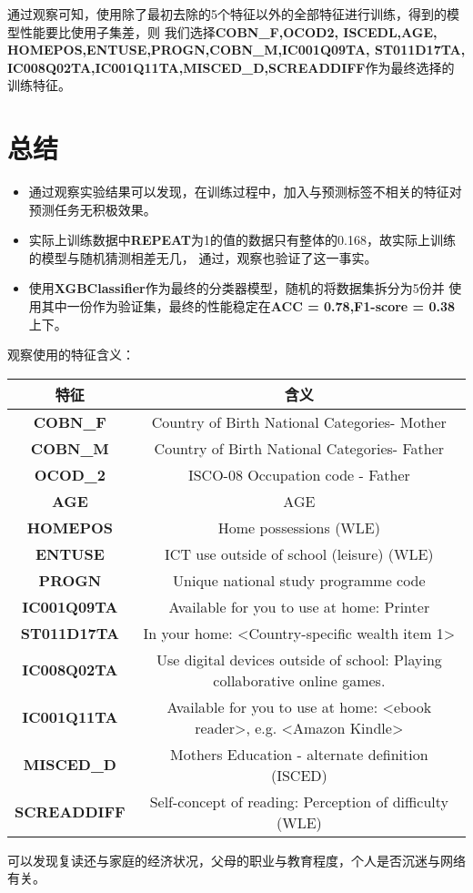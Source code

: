 \documentclass[12pt, a4paper, oneside]{ctexart}
\begin{document}
通过观察可知，使用除了最初去除的5个特征以外的全部特征进行训练，得到的模型性能要比使用子集差，则
我们选择\textbf{COBN\_F,OCOD2, ISCEDL,AGE,\\HOMEPOS,ENTUSE,PROGN,COBN\_M,IC001Q09TA,
ST011D17TA,\\IC008Q02TA,IC001Q11TA,MISCED\_D,SCREADDIFF}作为最终选择的训练特征。

\section{总结}
\begin{itemize}
    \item 通过观察实验结果可以发现，在训练过程中，加入与预测标签不相关的特征对预测任务无积极效果。
    \item 实际上训练数据中\textbf{REPEAT}为1的值的数据只有整体的0.168，故实际上训练的模型与随机猜测相差无几，
    通过，观察也验证了这一事实。
    \item 使用\textbf{XGBClassifier}作为最终的分类器模型，随机的将数据集拆分为5份并
    使用其中一份作为验证集，最终的性能稳定在\textbf{ACC = 0.78,F1-score = 0.38}上下。
\end{itemize}


观察使用的特征含义：
\begin{table*}[h]
    \centering%
    \begin{tabular}{cc}%
    \toprule%
    特征&含义 \\
    \midrule%
    \textbf{COBN\_F} &Country of Birth National Categories- Mother\\
    \textbf{COBN\_M} &Country of Birth National Categories- Father\\
    \textbf{OCOD\_2} &ISCO-08 Occupation code - Father\\
    \textbf{AGE} &AGE\\
    \textbf{HOMEPOS} &Home possessions (WLE)\\
    \textbf{ENTUSE} &ICT use outside of school (leisure) (WLE)\\
    \textbf{PROGN} &Unique national study programme code\\
    \textbf{IC001Q09TA} &Available for you to use at home: Printer\\
    \textbf{ST011D17TA} &In your home: <Country-specific wealth item 1>\\
    \textbf{IC008Q02TA} &Use digital devices outside of school: Playing collaborative online games.\\
    \textbf{IC001Q11TA} &Available for you to use at home: <ebook reader>, e.g. <Amazon Kindle>\\
    \textbf{MISCED\_D} &Mothers Education - alternate definition (ISCED)\\
    \textbf{SCREADDIFF} &Self-concept of reading: Perception of difficulty (WLE)\\
    
    \bottomrule%
    \end{tabular}
\end{table*}

可以发现复读还与家庭的经济状况，父母的职业与教育程度，个人是否沉迷与网络有关。
\end{document}
